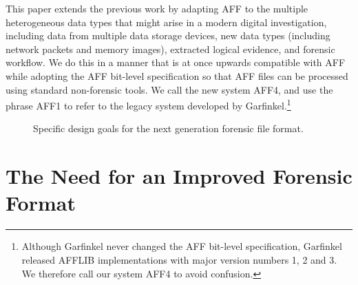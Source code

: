 \documentclass[10pt, conference]{IEEEtran}
\begin{document}
This paper extends the previous work by adapting AFF to the multiple
heterogeneous data types that might arise in a modern digital
investigation, including data from multiple data storage devices, new
data types (including network packets and memory images), extracted
logical evidence, and forensic workflow. We do this in a manner that
is at once upwards compatible with AFF while adopting the AFF
bit-level specification so that AFF files can be processed using
standard non-forensic tools. We call the new system AFF4, and use the
phrase AFF1 to refer to the legacy system developed by
Garfinkel.\footnote{Although Garfinkel never changed the AFF bit-level
specification, Garfinkel released AFFLIB implementations with major
version numbers 1, 2 and 3. We therefore call our system AFF4 to avoid
confusion.}

\begin{figure}
\caption{Specific design goals for the next generation forensic file
  format.}
\end{figure}
\section{The Need for an Improved Forensic Format}
\end{document}
